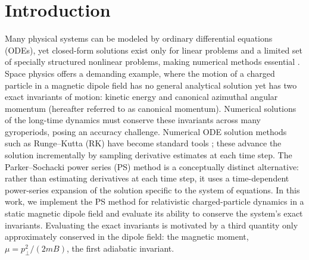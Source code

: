 \documentclass{article}
\begin{document}
\section{Introduction}\label{SEC:intro}
Many physical systems can be modeled by ordinary differential equations (ODEs), yet closed-form solutions exist only for linear problems and a limited set of specially structured nonlinear problems, making numerical methods essential \cite{Chapra2021}. Space physics offers a demanding example, where the motion of a charged particle in a magnetic dipole field has no general analytical solution \cite{DragtFinn1976} yet has two exact invariants of motion: kinetic energy and canonical azimuthal angular momentum (hereafter referred to as canonical momentum). Numerical solutions of the long-time dynamics must conserve these invariants across many gyroperiods, posing an accuracy challenge. Numerical ODE solution methods such as Runge--Kutta (RK) have become standard tools \cite{Chapra2021, Butcher2016}; these advance the solution incrementally by sampling derivative estimates at each time step. The Parker--Sochacki power series (PS) method is a conceptually distinct alternative: rather than estimating derivatives at each time step, it uses a time-dependent power-series expansion of the solution specific to the system of equations. In this work, we implement the PS method for relativistic charged-particle dynamics in a static magnetic dipole field and evaluate its ability to conserve the system's exact invariants. Evaluating the exact invariants is motivated by a third quantity only approximately conserved in the dipole field: the magnetic moment, $\mu = p_{\perp}^{2}/(2mB)$, the first adiabatic invariant.

\end{document}
